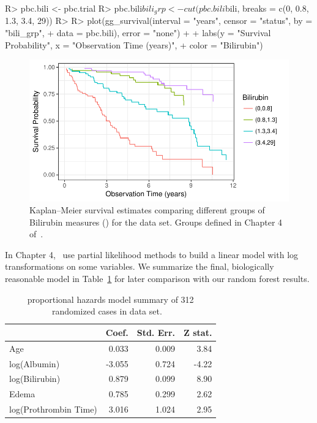 \documentclass[nojss]{jss}
\begin{document}
\begin{Schunk}
\begin{Sinput}
R> pbc.bili <- pbc.trial
R> pbc.bili$bili_grp <- cut(pbc.bili$bili, breaks = c(0, 0.8, 1.3, 3.4, 29))
R> 
R> plot(gg_survival(interval = "years", censor = "status", by = "bili_grp",
+                  data = pbc.bili), error = "none") +
+   labs(y = "Survival Probability", x = "Observation Time (years)",
+        color = "Bilirubin")
\end{Sinput}
\begin{figure}[!htb]

{\centering \includegraphics[width=\maxwidth]{fig-rfs/rfs-gg_survival-bili-1} 

}

\caption{Kaplan--Meier survival estimates comparing different groups of Bilirubin measures () for the  data set. Groups defined in Chapter 4 of~\cite{fleming:1991}.}\label{fig:gg_survival-bili}
\end{figure}
\end{Schunk}

In Chapter 4,~\cite{fleming:1991} use partial likelihood methods to build a linear model with log transformations on some variables. We summarize the final, biologically reasonable model in Table~\ref{T:FHmodel} for later comparison with our random forest results.

\begin{table}

\caption{\label{T:FHmodel} proportional hazards model summary of 312 randomized cases in  data set. ~\citep[Table 4.4.3c]{fleming:1991} }
\centering
\begin{tabular}[t]{lrrr}
\toprule
  & Coef. & Std. Err. & Z stat.\\
\midrule
Age & 0.033 & 0.009 & 3.84\\
log(Albumin) & -3.055 & 0.724 & -4.22\\
log(Bilirubin) & 0.879 & 0.099 & 8.90\\
Edema & 0.785 & 0.299 & 2.62\\
log(Prothrombin Time) & 3.016 & 1.024 & 2.95\\
\bottomrule
\end{tabular}
\end{table}
\end{document}
